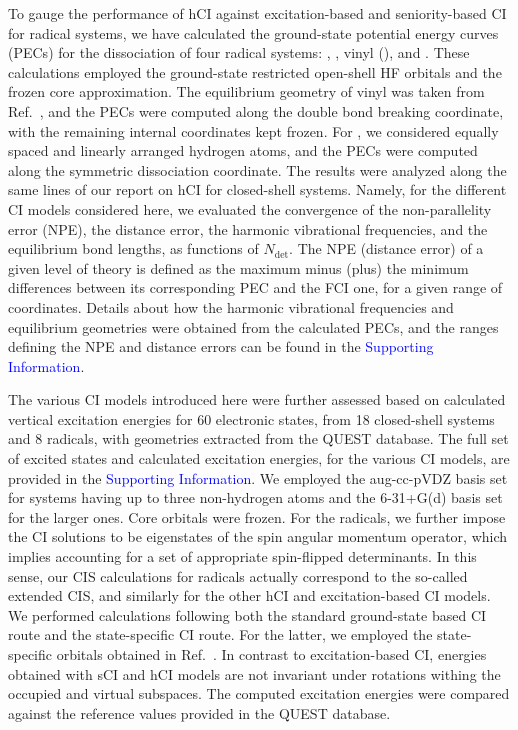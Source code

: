 \documentclass[aip,jcp,reprint,noshowkeys,superscriptaddress]{revtex4-1}
\newcommand{\SupInf}{\textcolor{blue}{Supporting Information}}
\newcommand{\Ndet}{N_\text{det}}
\begin{document}
To gauge the performance of hCI against excitation-based and seniority-based CI for radical systems,
we have calculated the ground-state potential energy curves (PECs) for the dissociation of four radical systems:
, , vinyl (), and .
These calculations employed the ground-state restricted open-shell HF orbitals and the frozen core approximation.
The equilibrium geometry of vinyl was taken from Ref.~,
and the PECs were computed along the  double bond breaking coordinate, with the remaining internal coordinates kept frozen.
For , we considered equally spaced and linearly arranged hydrogen atoms, and the PECs were computed along the symmetric dissociation coordinate.
The results were analyzed along the same lines of our report on hCI for closed-shell systems. \cite{Kossoski_2022}
Namely, for the different CI models considered here, 
we evaluated the convergence of the non-parallelity error (NPE), the distance error, the harmonic vibrational frequencies, and the equilibrium bond lengths, as functions of $\Ndet$.
The NPE (distance error) of a given level of theory is defined as the maximum minus (plus) the minimum differences between its corresponding PEC and the FCI one, for a given range of coordinates.
Details about how the harmonic vibrational frequencies and equilibrium geometries were obtained from the calculated PECs,
and the ranges defining the NPE and distance errors can be found in the \SupInf.

The various CI models introduced here were further assessed based on calculated vertical excitation energies for 60 electronic states,
from 18 closed-shell systems and 8 radicals, with geometries extracted from the QUEST database. \cite{Veril_2021}
The full set of excited states and calculated excitation energies, for the various CI models, are provided in the {\SupInf}.
We employed the aug-cc-pVDZ basis set for systems having up to three non-hydrogen atoms and the 6-31+G(d) basis set for the larger ones.
Core orbitals were frozen.
For the radicals, we further impose the CI solutions to be eigenstates of the spin angular momentum operator, which implies accounting for a set of appropriate spin-flipped determinants.
In this sense, our CIS calculations for radicals actually correspond to the so-called extended CIS, \cite{Maurice_1996} and similarly for the other hCI and excitation-based CI models.
We performed calculations following both the standard ground-state based CI route and the state-specific CI route. \cite{Kossoski_2023}
For the latter, we employed the state-specific orbitals obtained in Ref.~.
In contrast to excitation-based CI, energies obtained with sCI and hCI models are not invariant under rotations withing the occupied and virtual subspaces.
The computed excitation energies were compared against the reference values provided in the QUEST database. \cite{Veril_2021}
\end{document}
